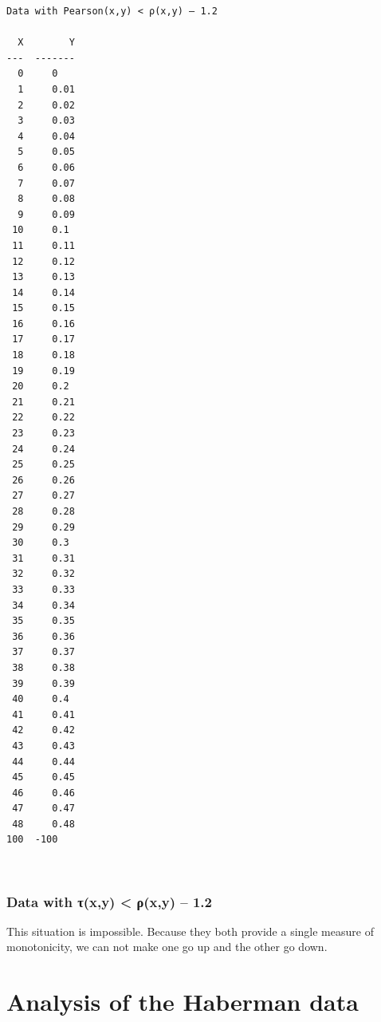 \documentclass[11pt]{article}
\begin{document}
    \begin{Verbatim}[commandchars=\\\{\}]
Data with Pearson(x,y) < ρ(x,y) – 1.2

  X        Y
---  -------
  0     0
  1     0.01
  2     0.02
  3     0.03
  4     0.04
  5     0.05
  6     0.06
  7     0.07
  8     0.08
  9     0.09
 10     0.1
 11     0.11
 12     0.12
 13     0.13
 14     0.14
 15     0.15
 16     0.16
 17     0.17
 18     0.18
 19     0.19
 20     0.2
 21     0.21
 22     0.22
 23     0.23
 24     0.24
 25     0.25
 26     0.26
 27     0.27
 28     0.28
 29     0.29
 30     0.3
 31     0.31
 32     0.32
 33     0.33
 34     0.34
 35     0.35
 36     0.36
 37     0.37
 38     0.38
 39     0.39
 40     0.4
 41     0.41
 42     0.42
 43     0.43
 44     0.44
 45     0.45
 46     0.46
 47     0.47
 48     0.48
100  -100

    \end{Verbatim}

    \begin{center}
    \end{center}
    { \hspace*{\fill} \\}
    
    \hypertarget{data-with-ux3c4xy-ux3c1xy-1.2}{%
\subsubsection{\texorpdfstring{Data with τ(x,y) \textless{} ρ(x,y) --
1.2\n}{Data with τ(x,y) \textless{} ρ(x,y) -- 1.2}}\label{data-with-ux3c4xy-ux3c1xy-1.2}}

This situation is impossible. Because they both provide a single measure
of monotonicity, we can not make one go up and the other go down.

    \hypertarget{analysis-of-the-haberman-data}{%
\section{Analysis of the Haberman
data}\label{analysis-of-the-haberman-data}}
\end{document}

